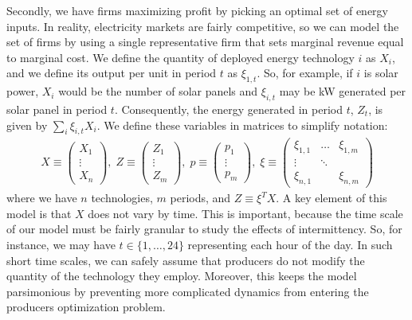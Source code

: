 \documentclass[11pt,a4paper]{extarticle}
\begin{document}
Secondly, we have firms maximizing profit by picking an optimal set of energy inputs. In reality, electricity markets are fairly competitive, so we can model the set of firms by using a single representative firm that sets marginal revenue equal to marginal cost. We define the quantity of deployed energy technology $i$ as $X_i$, and we define its output per unit in period $t$ as $\xi_{1,t}$. So, for example, if $i$ is solar power, $X_i$ would be the number of solar panels and $\xi_{i,t}$ may be kW generated per solar panel in period $t$. Consequently, the energy generated in period $t$, $Z_t$, is given by $\sum_i \xi_{i,t} X_i$. We define these variables in matrices to simplify notation:
\begin{align*}
X \equiv \begin{pmatrix}
X_1\\
\vdots\\
X_n
\end{pmatrix} ,\;
Z \equiv \begin{pmatrix}
Z_1\\
\vdots\\
Z_m
\end{pmatrix} ,\;
p \equiv \begin{pmatrix}
p_1\\
\vdots\\
p_m
\end{pmatrix} ,\;
\xi \equiv \begin{pmatrix}
\xi_{1,1} & \dots & \xi_{1,m}\\
\vdots & \ddots & \\
\xi_{n,1} &  & \xi_{n,m}
\end{pmatrix} 
\end{align*}
where we have $n$ technologies, $m$ periods, and $Z \equiv \xi^T X$. A key element of this model is that $X$ does not vary by time. This is important, because the time scale of our model must be fairly granular to study the effects of intermittency. So, for instance, we may have $t \in \{ 1, \dots, 24\}$ representing each hour of the day. In such short time scales, we can safely assume that producers do not modify the quantity of the technology they employ. Moreover, this keeps the model parsimonious by preventing more complicated dynamics from entering the producers optimization problem. 
\end{document}
